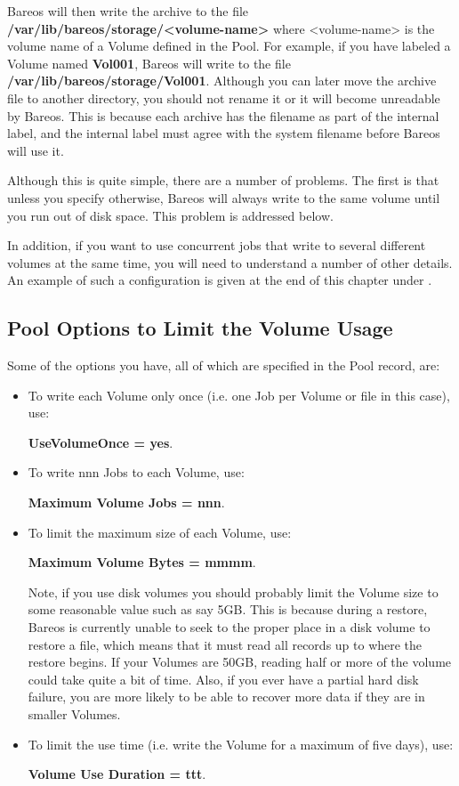 Bareos will then write the archive to the file {\bf
/var/lib/bareos/storage/{\textless}volume-name{\textgreater}}
where {\textless}volume-name{\textgreater} is the
volume name of a Volume defined in the Pool. For example, if you have labeled
a Volume named {\bf Vol001}, Bareos will write to the file {\bf
/var/lib/bareos/storage/Vol001}. Although you can later move the archive file to
another directory, you should not rename it or it will become unreadable by
Bareos. This is because each archive has the filename as part of the internal
label, and the internal label must agree with the system filename before
Bareos will use it.

Although this is quite simple, there are a number of problems. The first is
that unless you specify otherwise, Bareos will always write to the same volume
until you run out of disk space. This problem is addressed below.

In addition, if you want to use concurrent jobs that write to several
different volumes at the same time, you will need to understand a number
of other details. An example of such a configuration is given
at the end of this chapter under .

\subsection{Pool Options to Limit the Volume Usage}

Some of the options you have, all of which are specified in the Pool record,
are:

\begin{itemize}
\item To write each Volume only once (i.e. one Job per Volume or file  in this
   case), use:

{\bf UseVolumeOnce = yes}.

\item To write nnn Jobs to each Volume, use:

   {\bf Maximum Volume Jobs = nnn}.

\item To limit the maximum size of each Volume, use:

   {\bf Maximum Volume Bytes = mmmm}.

   Note, if you use disk volumes you should probably limit the Volume size to some reasonable
   value such as say 5GB. This is because during a restore, Bareos is
   currently unable to seek to the proper place in a disk volume to restore
   a file, which means that it must read all records up to where the
   restore begins. If your Volumes are 50GB, reading half or more of the
   volume could take quite a bit of time.  Also, if you ever have a partial
   hard disk failure, you are more likely to be able to recover more data
   if they are in smaller Volumes.

\item To limit the use time (i.e. write the Volume for a maximum of five days),
   use:

{\bf Volume Use Duration = ttt}.
\end{itemize}

